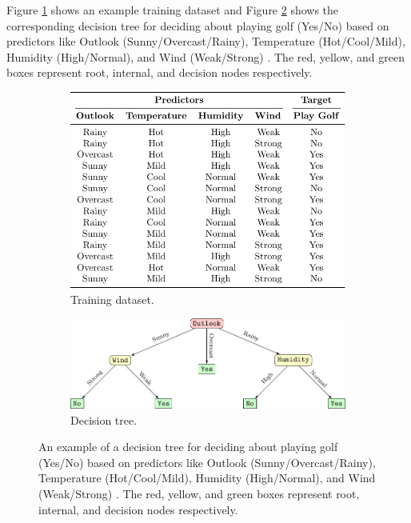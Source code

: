 Figure \ref{fig:ex-dtree-dataset} shows an example training dataset and Figure \ref{fig:ex-dtree} shows the corresponding decision tree for deciding about playing golf (Yes/No) based on predictors like Outlook (Sunny/Overcast/Rainy), Temperature (Hot/Cool/Mild), Humidity (High/Normal), and Wind (Weak/Strong) \cite{DecTreeExample}. The red, yellow, and green boxes represent root, internal, and decision nodes respectively.
\begin{figure}[htb!]
	\centering
	\begin{subfigure}[b]{0.6\textwidth}
		\centering
		\includegraphics[width=\textwidth,keepaspectratio]{images/background/Decision_Tree_Table.pdf}
		\caption{Training dataset.}
		\label{fig:ex-dtree-dataset}
	\end{subfigure}
	\hfill
	\begin{subfigure}[b]{\textwidth}
		\centering
		\includegraphics[width=\textwidth,keepaspectratio]{images/background/decision_tree_new.pdf}
		\caption{Decision tree.}
		\label{fig:ex-dtree}
	\end{subfigure}
	
	\caption[An example of decision tree]{An example of a decision tree for deciding about playing golf (Yes/No) based on predictors like Outlook (Sunny/Overcast/Rainy), Temperature (Hot/Cool/Mild), Humidity (High/Normal), and Wind (Weak/Strong) \cite{DecTreeExample}.  The red, yellow, and green boxes represent root, internal, and decision nodes respectively.}
	\label{fig:DecTreeExample}
\end{figure}

